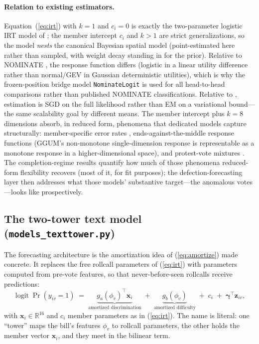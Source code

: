 \documentclass[11pt]{article}
\newcommand{\code}[1]{\texttt{#1}}
\begin{document}
\paragraph{Relation to existing estimators.} Equation~(\ref{eq:irt})
with $k = 1$ and $c_i = 0$ is exactly the two-parameter logistic IRT
model of \citet{clinton2004statistical}; the member intercept $c_i$ and
$k > 1$ are strict generalizations, so the model \emph{nests} the
canonical Bayesian spatial model (point-estimated here rather than
sampled, with weight decay standing in for the prior). Relative to
NOMINATE \citep{poole1997congress}, the response function differs
(logistic in a linear utility difference rather than normal/GEV in
Gaussian deterministic utilities), which is why the frozen-position
bridge model \code{NominateLogit} is used for all head-to-head
comparisons rather than published NOMINATE classifications. Relative to
\citet{imai2016fast}, estimation is SGD on the full likelihood rather
than EM on a variational bound---the same scalability goal by different
means. The member intercept plus $k = 8$ dimensions absorb, in reduced
form, phenomena that dedicated models capture structurally:
member-specific error rates \citep{lauderdale2010unpredictable},
ends-against-the-middle response functions \citep{duckmayr2023ends}
(GGUM's non-monotone single-dimension response is representable as a
monotone response in a higher-dimensional space), and protest-vote
mixtures \citep{fowler2026protest}. The completion-regime results
quantify how much of those phenomena reduced-form flexibility recovers
(most of it, for fit purposes); the defection-forecasting layer then
addresses what those models' substantive target---the anomalous
votes---looks like prospectively.

\subsection{The two-tower text model (\code{models\_texttower.py})}
\label{sec:texttower}

The forecasting architecture is the amortization idea of
(\ref{eq:amortize}) made concrete. It replaces the free rollcall
parameters of (\ref{eq:irt}) with parameters computed from pre-vote
features, so that never-before-seen rollcalls receive predictions:
\begin{equation}
\operatorname{logit}\Pr(y_{iv}=1) \;=\;
\underbrace{g_a(\phi_v)^\top \mathbf{x}_i}_{\text{amortized
discrimination}} \;+\; \underbrace{g_b(\phi_v)}_{\text{amortized
difficulty}} \;+\; c_i \;+\;
\boldsymbol\gamma^\top \mathbf{z}_{iv},
\label{eq:tower}
\end{equation}
with $\mathbf{x}_i \in \mathbb{R}^{16}$ and $c_i$ member parameters as
in (\ref{eq:irt}). The name is literal: one ``tower'' maps the bill's
features $\phi_v$ to rollcall parameters, the other holds the member
vector $\mathbf{x}_i$, and they meet in the bilinear term.
\end{document}
